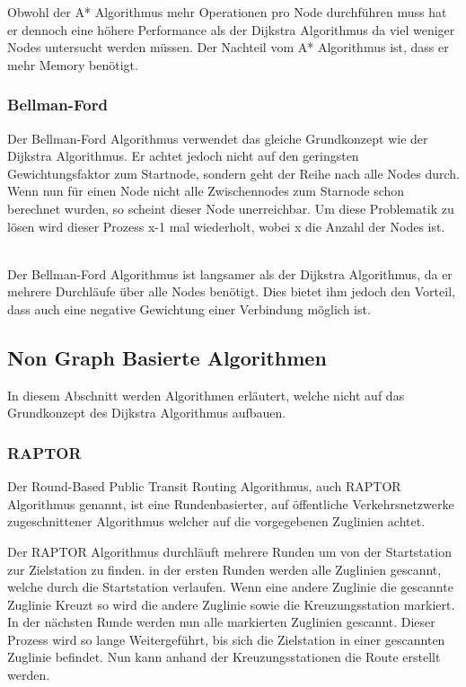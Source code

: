 Obwohl der A* Algorithmus mehr Operationen pro Node durchführen muss hat er dennoch eine höhere Performance als der Dijkstra Algorithmus da viel weniger Nodes untersucht werden müssen. Der Nachteil vom A* Algorithmus ist, dass er mehr Memory benötigt. ~\cite{dij_a}

 

\subsubsection{Bellman-Ford}
\label{sec:Bellman-Ford}
Der Bellman-Ford Algorithmus verwendet das gleiche Grundkonzept wie der Dijkstra Algorithmus. Er achtet jedoch nicht auf den geringsten Gewichtungsfaktor zum Startnode, sondern geht der Reihe nach alle Nodes durch. Wenn nun für einen Node nicht alle Zwischennodes zum Starnode schon berechnet wurden, so scheint dieser Node unerreichbar. Um diese Problematik zu lösen wird dieser Prozess x-1 mal wiederholt, wobei x die Anzahl der Nodes ist. ~\cite{dij_bell} ~\cite{bell}

Der Bellman-Ford Algorithmus ist langsamer als der Dijkstra Algorithmus, da er mehrere Durchläufe über alle Nodes benötigt. Dies bietet ihm jedoch den Vorteil, dass auch eine negative Gewichtung einer Verbindung möglich ist.

\subsection{Non Graph Basierte Algorithmen}
\label{sec:Non Graph Basierte Algorithmen}
In diesem Abschnitt werden Algorithmen erläutert, welche nicht auf das Grundkonzept des Dijkstra Algorithmus aufbauen.

\subsubsection{RAPTOR}
\label{sec:RAPTOR}
Der Round-Based Public Transit Routing Algorithmus, auch RAPTOR Algorithmus genannt, ist eine Rundenbasierter, auf öffentliche Verkehrsnetzwerke zugeschnittener Algorithmus welcher auf die vorgegebenen Zuglinien achtet.

Der RAPTOR Algorithmus durchläuft mehrere Runden um von der Startstation zur Zielstation zu finden. in der ersten Runden werden alle Zuglinien gescannt, welche durch die Startstation verlaufen. Wenn eine andere Zuglinie die gescannte Zuglinie Kreuzt so wird die andere Zuglinie sowie die Kreuzungsstation markiert. In der nächsten Runde werden nun alle markierten Zuglinien gescannt. Dieser Prozess wird so lange Weitergeführt, bis sich die Zielstation in einer gescannten Zuglinie befindet. Nun kann anhand der Kreuzungsstationen die Route erstellt werden.

